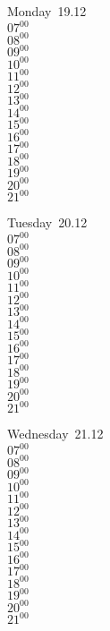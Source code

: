 \documentclass[11pt,a4paper]{book}\usepackage[]{graphicx}\usepackage[]{color}
\begin{document}
\begin{headerbox}
\end{headerbox}
\begin{weekdaybox}
  Monday~19.12\\
  { 
  \vfill
  $07^{00}$\\
$08^{00}$\\
$09^{00}$\\
$10^{00}$\\
$11^{00}$\\
$12^{00}$\\
$13^{00}$\\
$14^{00}$\\
$15^{00}$\\
$16^{00}$\\
$17^{00}$\\
$18^{00}$\\
$19^{00}$\\
$20^{00}$\\
$21^{00}$\\
  }
\end{weekdaybox}
\begin{weekdaybox}
  Tuesday~20.12\\
  { 
  \vfill
  $07^{00}$\\
$08^{00}$\\
$09^{00}$\\
$10^{00}$\\
$11^{00}$\\
$12^{00}$\\
$13^{00}$\\
$14^{00}$\\
$15^{00}$\\
$16^{00}$\\
$17^{00}$\\
$18^{00}$\\
$19^{00}$\\
$20^{00}$\\
$21^{00}$\\
  }
\end{weekdaybox}
\begin{weekdaybox}
  Wednesday~21.12\\
  { 
  \vfill
  $07^{00}$\\
$08^{00}$\\
$09^{00}$\\
$10^{00}$\\
$11^{00}$\\
$12^{00}$\\
$13^{00}$\\
$14^{00}$\\
$15^{00}$\\
$16^{00}$\\
$17^{00}$\\
$18^{00}$\\
$19^{00}$\\
$20^{00}$\\
$21^{00}$\\
  }
\end{weekdaybox}
\end{document}
